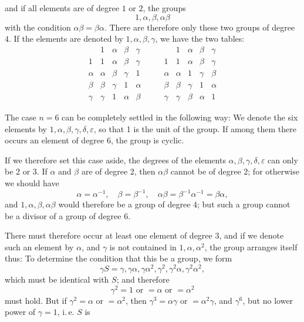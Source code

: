 and if all elements are of degree $1$ or $2$, the groups
\[
1, \alpha, \beta, \alpha\beta
\]
with the condition $\alpha\beta = \beta\alpha$. There are therefore only these two groups of degree $4$. If the elements are denoted by $1, \alpha, \beta, \gamma$, we have the two tables:
\[
\begin{array}{c|cccc}
 & 1 & \alpha & \beta & \gamma \\
\hline
1 & 1 & \alpha & \beta & \gamma \\
\alpha & \alpha & \beta & \gamma & 1 \\
\beta & \beta & \gamma & 1 & \alpha \\
\gamma & \gamma & 1 & \alpha & \beta
\end{array}
\qquad
\begin{array}{c|cccc}
 & 1 & \alpha & \beta & \gamma \\
\hline
1 & 1 & \alpha & \beta & \gamma \\
\alpha & \alpha & 1 & \gamma & \beta \\
\beta & \beta & \gamma & 1 & \alpha \\
\gamma & \gamma & \beta & \alpha & 1
\end{array}
\]

The case $n = 6$ can be completely settled in the following way: We denote the six elements by $1, \alpha, \beta, \gamma, \delta, \varepsilon$, so that 1 is the unit of the group. If among them there occurs an element of degree 6, the group is cyclic.

If we therefore set this case aside, the degrees of the elements $\alpha, \beta, \gamma, \delta, \varepsilon$ can only be 2 or 3. If $\alpha$ and $\beta$ are of degree $2$, then $\alpha\beta$ cannot be of degree $2$; for otherwise we should have
\[
\alpha = \alpha^{-1}, \quad \beta = \beta^{-1}, \quad \alpha\beta = \beta^{-1}\alpha^{-1} = \beta\alpha,
\]
and $1, \alpha, \beta, \alpha\beta$ would therefore be a group of degree $4$; but such a group cannot be a divisor of a group of degree $6$.

There must therefore occur at least one element of degree $3$, and if we denote such an element by $\alpha$, and $\gamma$ is not contained in $1, \alpha, \alpha^2$, the group arranges itself thus:
To determine the condition that this be a group, we form
\[
\gamma S = \gamma, \gamma\alpha, \gamma\alpha^2, \gamma^2, \gamma^2\alpha, \gamma^2\alpha^2,
\]
which must be identical with $S$; and therefore
\[
\gamma^2 = 1 \text{ or } = \alpha \text{ or } = \alpha^2
\]
must hold. But if $\gamma^2 = \alpha$ or $= \alpha^2$, then $\gamma^3 = \alpha\gamma$ or $= \alpha^2\gamma$, and $\gamma^6$, but no lower power of $\gamma = 1$, i.\,e. $S$ is
